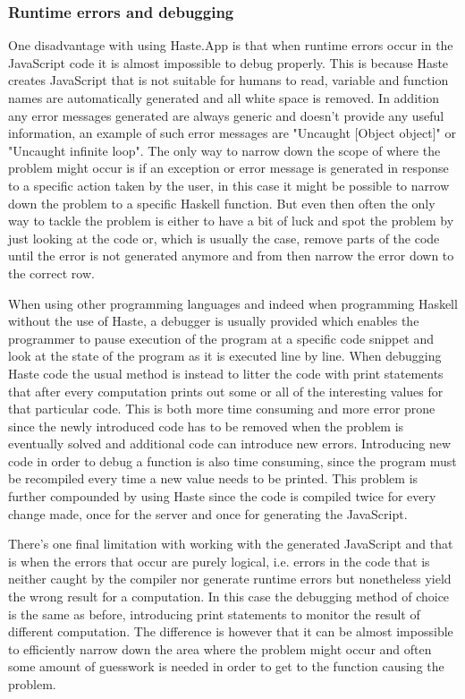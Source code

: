 \documentclass[a4paper]{article}
\begin{document}
\subsubsection{Runtime errors and debugging} 
\label{subsub:runtime-errors-debugging}
One disadvantage with using Haste.App is that when runtime errors occur in the JavaScript code it is almost impossible to debug properly. This is because Haste creates JavaScript that is not suitable for humans to read, variable and function names are automatically generated and all white space is removed. In addition any error messages generated are always generic and doesn't provide any useful information, an example of such error messages are "Uncaught [Object object]" or "Uncaught infinite loop". The only way to narrow down the scope of where the problem might occur is if an exception or error message is generated in response to a specific action taken by the user, in this case it might be possible to narrow down the problem to a specific Haskell function. But even then often the only way to tackle the problem is either to have a bit of luck and spot the problem by just looking at the code or, which is usually the case, remove parts of the code until the error is not generated anymore and from then narrow the error down to the correct row.

When using other programming languages and indeed when programming Haskell without the use of Haste, a debugger is usually provided which enables the programmer to pause execution of the program at a specific code snippet and look at the state of the program as it is executed line by line. When debugging Haste code the usual method is instead to litter the code with print statements that after every computation prints out some or all of the interesting values for that particular code. This is both more time consuming and more error prone since the newly introduced code has to be removed when the problem is eventually solved and additional code can introduce new errors. Introducing new code in order to debug a function is also time consuming, since the program must be recompiled every time a new value needs to be printed. This problem is further compounded by using Haste since the code is compiled twice for every change made, once for the server and once for generating the JavaScript.

There's one final limitation with working with the generated JavaScript and that is when the errors that occur are purely logical, i.e. errors in the code that is neither caught by the compiler nor generate runtime errors but nonetheless yield the wrong result for a computation. In this case the debugging method of choice is the same as before, introducing print statements to monitor the result of different computation. The difference is however that it can be almost impossible to efficiently narrow down the area where the problem might occur and often some amount of guesswork is needed in order to get to the function causing the problem.
\end{document}
